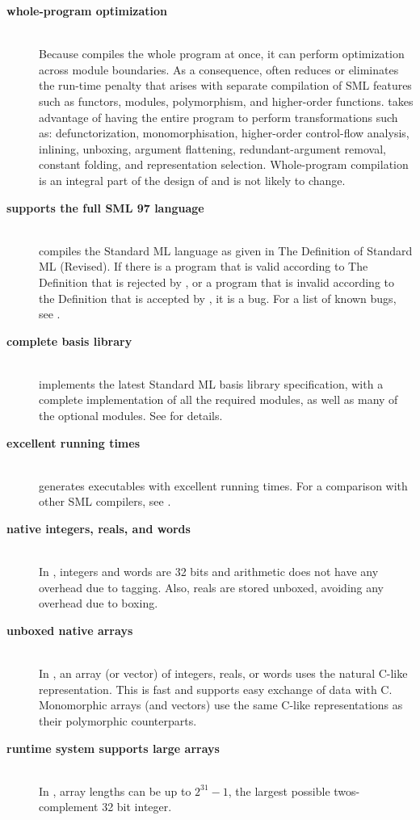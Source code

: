 %
\newcommand{\feature}[1]{\item[\bf #1]\hspace{1in}\\}
%
\begin{description}
\feature{whole-program optimization}
Because {\mlton} compiles the whole program at once, it can perform
optimization across module boundaries.  As a consequence, {\mlton}
often reduces or eliminates the run-time penalty that arises with
separate compilation of SML features such as functors, modules,
polymorphism, and higher-order functions.  {\mlton} takes advantage of
having the entire program to perform transformations such as:
defunctorization, monomorphisation, higher-order control-flow
analysis, inlining, unboxing, argument flattening, redundant-argument
removal, constant folding, and representation selection.
Whole-program compilation is an integral part of the design of
{\mlton} and is not likely to change.

\feature{supports the full SML 97 language}
{\mlton} compiles the Standard ML language as given in The Definition
of Standard ML (Revised)\cite{MTHM97}.  If there is a program that is
valid according to The Definition that is rejected by {\mlton}, or a
program that is invalid according to the Definition that is accepted
by {\mlton}, it is a bug.  For a list of known bugs, see
.

\feature{complete basis library}
{\mlton} implements the latest Standard ML basis library
specification, with a complete implementation of all the required
modules, as well as many of the optional modules.  See
 for details.

\feature{excellent running times}
{\mlton} generates executables with excellent running times.
For a comparison with other SML compilers, see
.

\feature{native integers, reals, and words}
In {\mlton}, integers and words are 32 bits and arithmetic does not have
any overhead due to tagging.  Also, reals are stored unboxed, avoiding
any overhead due to boxing.

\feature{unboxed native arrays}
In {\mlton}, an array (or vector) of integers, reals, or words uses
the natural C-like representation.  This is fast and supports easy
exchange of data with C.  Monomorphic arrays (and vectors) use the
same C-like representations as their polymorphic counterparts.

\feature{runtime system supports large arrays}
In {\mlton}, array lengths can be up to $2^{31} - 1$, the largest possible
twos-complement 32 bit integer.


\end{description}
